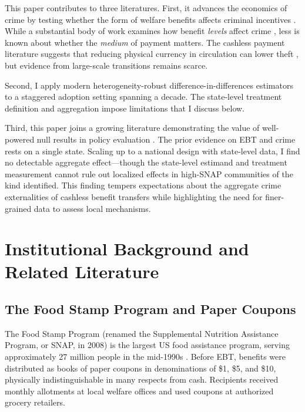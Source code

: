 \documentclass[12pt]{article}
\begin{document}
This paper contributes to three literatures. First, it advances the economics of crime by testing whether the form of welfare benefits affects criminal incentives \citep{becker1968crime, ehrlich1973participation}. While a substantial body of work examines how benefit \textit{levels} affect crime \citep{foley2011effect, carr2019snap, tuttle2019snapping}, less is known about whether the \textit{medium} of payment matters. The cashless payment literature suggests that reducing physical currency in circulation can lower theft \citep{rogoff2017curse, wright2017less}, but evidence from large-scale transitions remains scarce.

Second, I apply modern heterogeneity-robust difference-in-differences estimators to a staggered adoption setting spanning a decade. The state-level treatment definition and aggregation impose limitations that I discuss below.

Third, this paper joins a growing literature demonstrating the value of well-powered null results in policy evaluation \citep{ioannidis2017power}. The prior evidence on EBT and crime rests on a single state. Scaling up to a national design with state-level data, I find no detectable aggregate effect---though the state-level estimand and treatment measurement cannot rule out localized effects in high-SNAP communities of the kind \citet{wright2017less} identified. This finding tempers expectations about the aggregate crime externalities of cashless benefit transfers while highlighting the need for finer-grained data to assess local mechanisms.



\section{Institutional Background and Related Literature} \label{sec:background}

\subsection{The Food Stamp Program and Paper Coupons}

The Food Stamp Program (renamed the Supplemental Nutrition Assistance Program, or SNAP, in 2008) is the largest US food assistance program, serving approximately 27 million people in the mid-1990s \citep{usda2024snap, hoynes2016us}. Before EBT, benefits were distributed as books of paper coupons in denominations of \$1, \$5, and \$10, physically indistinguishable in many respects from cash. Recipients received monthly allotments at local welfare offices and used coupons at authorized grocery retailers.
\end{document}
